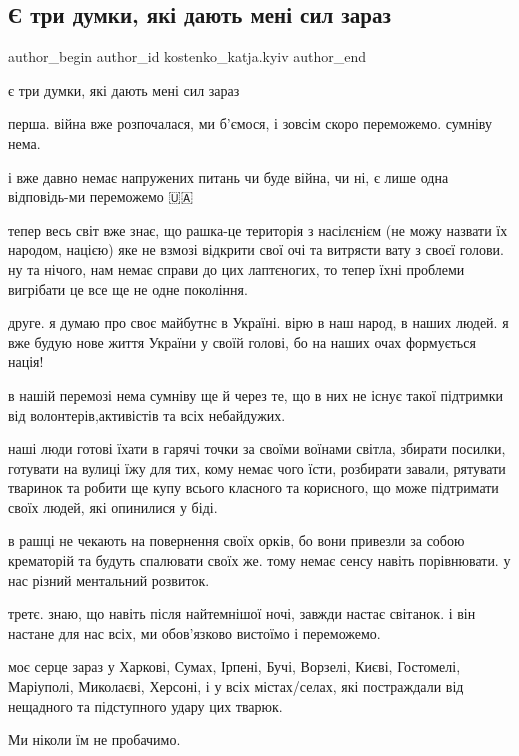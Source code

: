 





\subsection{Є три думки, які дають мені сил зараз}
\label{sec:09_03_2022.fb.kostenko_katja.kyiv.1.try_dumky}

\ifcmt
 author_begin
   author_id kostenko_katja.kyiv
 author_end
\fi

є три думки, які дають мені сил зараз

перша. війна вже розпочалася, ми б'ємося, і зовсім скоро переможемо. сумніву нема.

і вже давно немає напружених питань чи буде війна, чи ні, є лише одна
відповідь-ми переможемо 🇺🇦

тепер весь світ вже знає, що рашка-це територія з насілєнієм (не можу назвати
їх народом, нацією) яке не взмозі відкрити свої очі та витрясти вату з своєї
голови. ну та нічого, нам немає справи до цих лаптєногих, то тепер їхні
проблеми вигрібати це все ще не одне покоління.

друге. я думаю про своє майбутнє в Україні. вірю в наш народ, в наших людей. я
вже будую нове життя України у своїй голові, бо на наших очах формується нація!

в нашій перемозі нема сумніву ще й через те, що в них не існує такої підтримки
від волонтерів,активістів та всіх небайдужих.

наші люди готові їхати в гарячі точки за своїми воїнами світла, збирати
посилки, готувати на вулиці їжу для тих, кому немає чого їсти, розбирати
завали, рятувати тваринок та робити ще купу всього класного та корисного, що
може підтримати своїх людей, які опинилися у біді.

в рашці не чекають на повернення своїх орків, бо вони привезли за собою
крематорій та будуть спалювати своїх же. тому немає сенсу навіть порівнювати. у
нас різний ментальний розвиток.

третє. знаю, що навіть після найтемнішої ночі, завжди настає світанок. і він
настане для нас всіх, ми обов'язково вистоїмо і переможемо.

моє серце зараз у Харкові, Сумах, Ірпені, Бучі, Ворзелі, Києві,  Гостомелі,
Маріуполі, Миколаєві, Херсоні, і у всіх містах/селах, які постраждали від
нещадного та підступного удару цих тварюк.

Ми ніколи їм не пробачимо.

